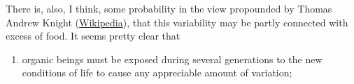 There is, also, I think, some probability in the view propounded by Thomas Andrew Knight (\href{http://www.wikipedia.org/}{Wikipedia}), that this variability may be partly connected with excess of food. It seems pretty clear that

\begin{enumerate}
\item organic beings must be exposed during several generations to the new conditions of life to cause any appreciable amount of variation;
\end{enumerate}